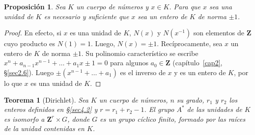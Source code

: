 \documentclass[oneside,bibtotoc,leqno,spanish]{amsbook}
\newcommand{\ZZ}{\mathbf{Z}}
\numberwithin{equation}{section}
\theoremstyle{defi}
\theoremstyle{note}
\newtheorem{theorem}{Teorema}
\newtheorem{proposition}{Proposici\'on}
\theoremstyle{rem}
\numberwithin{theorem}{section}
\numberwithin{proposition}{section}
\numberwithin{definition}{section}
\numberwithin{lemma}{section}
\numberwithin{corollary}{section}
\numberwithin{example}{section}
\numberwithin{footnote}{section}%
\begin{document}
\begin{proposition}\label{prop4.4.1}
Sea $K$ un cuerpo de n\'umeros y $x\in K$. Para que $x$ sea una unidad de $K$ es
necesario y suficiente que $x$ sea un entero de $K$ de norma $\pm 1$.
\end{proposition}

\begin{proof}
En efecto, si $x$ es una unidad de $K$, $N(x)$ y $N(x^{-1})$ son elementos de $\ZZ$ cuyo producto es
$N(1) = 1$. Luego, $N(x) = \pm 1$. Rec\'iprocamente, sea $x$ un entero de $K$ de norma $\pm 1$. Su
polinomio caracter\'istico se escribe $x^{n}+a_{n-1}x^{n-1}+\dots+a_{1}x\pm 1= 0$ para algunos
$a_{0}\in\ZZ$ (cap\'itulo~\ref{cap2}, \S\ref{sec2.6}). Luego $\pm(x^{n-1}+\dots+a_{1})$ es el inverso de $x$ y es un entero de
$K$, por lo que $x$ es una unidad de $K$.
\end{proof}

\begin{theorem}[Dirichlet]\label{teo4.4.1}
Sea $K$ un cuerpo de n\'umeros, $n$ su grado, $r_{1}$ y $r_{2}$ los enteros definidos en \S\ref{sec4.2}
y $r = r_{1}+r_{2}-1$. El grupo $A^{*}$ de las unidades de $K$ es isomorfo a $\ZZ^{r}\times G$, donde
$G$ es un grupo c\'iclico finito, formado por las ra\'ices de la unidad contenidas en $K$.
\end{theorem}
\end{document}
